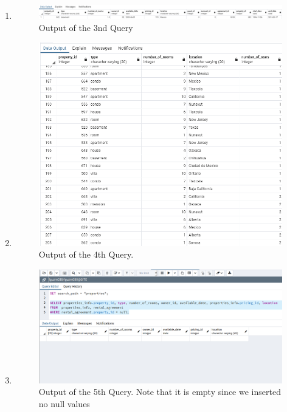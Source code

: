 \documentclass[12pt, lettersize]{article}
\theoremstyle{Remark}
\begin{document}
\begin{enumerate}
		\item 
		
		
		\begin{figure}[h]
			\centering
			\includegraphics[width= \linewidth]{Query3Output.png}
			\caption{Output of the 3nd Query}
		\end{figure}
	
		
		\item 
		
		
		\begin{figure}[h]
			\centering
			\includegraphics[width= 0.8\linewidth]{Query4Output.png}
			\caption{Output of the 4th Query.}
		\end{figure}
				
		\newpage
		
		\item 
		
		
		\begin{figure}[h]
			\centering
			\includegraphics[width= 0.8\linewidth]{Query5Output.png}
			\caption{Output of the 5th Query. Note that it is empty since we inserted no null values}
		\end{figure}
		

\end{enumerate}
\end{document}
